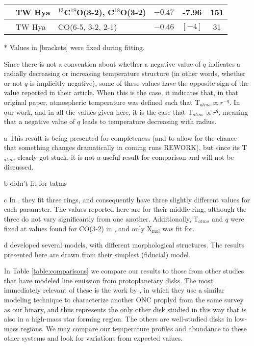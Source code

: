 \begin{table}[ht!]
\begin{threeparttable}
\begin{tabular}{l l l c c c }
      \hline
      \citet{Zhang2017}                     & TW Hya     & $^{13}$C$^{18}$O(3-2), C$^{18}$O(3-2)  & $-0.47$ & -7.96 & 151  \\
      \hline
      \citet{Flaherty2018}\tnote{d}         & TW Hya     & CO(6-5, 3-2, 2-1) & $-0.46$ & $[-4]$       & 31  \\
      \bottomrule
    \end{tabular}
    \begin{tablenotes}\footnotesize
      \item[*] Values in [brackets] were fixed during fitting.
      \item[\dagger] Since there is not a convention about whether a negative value of $q$ indicates a radially decreasing or increasing temperature structure (in other words, whether or not $q$ is implicitly negative), some of these values have the opposite sign of the value reported in their article. When this is the case, it indicates that, in that original paper, atmospheric temperature was defined such that T$_{atms} \propto r^{-q}$. In our work, and in all the values given here, it is the case that T$_{atms} \propto r^{q}$, meaning that a negative value of $q$ leads to temperature decreasing with radius.
      \item[a] This result is being presented for completeness (and to allow for the chance that something changes dramatically in coming runs REWORK), but since its T$_{atms}$ clearly got stuck, it is not a useful result for comparison and will not be discussed.
      \item[b] \cite{Rosenfeld2012} didn't fit for tatms
      \item[c] In \citet{Flaherty2017}, they fit three rings, and consequently have three slightly different values for each parameter. The values reported here are for their middle ring, although the three do not vary significantly from one another. Additionally, T$_{atms}$ and $q$ were fixed at values found for CO(3-2) in \citet{Flaherty2015}, and only X$_\text{mol}$ was fit for.
      \item[d] \citet{Flaherty2018} developed several models, with different morphological structures. The results presented here are drawn from their simplest (fiducial) model.
    \end{tablenotes}
  \end{threeparttable}
\end{table}

In Table \ref{table:comparisons} we compare our results to those from other studies that have modeled line emission from protoplanetary disks. The most immediately relevant of these is the work by \citet{Factor2017}, in which they use a similar modeling technique to characterize another ONC proplyd from the same survey as our binary, and thus represents the only other disk studied in this way that is also in a high-mass star forming region. The others are well-studied disks in low-mass regions. We may compare our temperature profiles and abundance to these other systems and look for variations from expected values.

